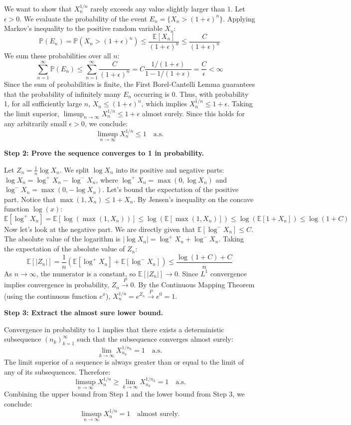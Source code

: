 \begin{solution}
We want to show that $X_n^{1/n}$ rarely exceeds any value slightly larger than $1$. Let $\epsilon > 0$. We evaluate the probability of the event $E_n = \{X_n > (1+\epsilon)^n\}$.
Applying Markov's inequality to the positive random variable $X_n$:
\[ \mathbb{P}(E_n) = \mathbb{P}(X_n > (1+\epsilon)^n) \leq \frac{\mathbb{E}[X_n]}{(1+\epsilon)^n} \leq \frac{C}{(1+\epsilon)^n} \]
We sum these probabilities over all $n$:
\[ \sum_{n=1}^\infty \mathbb{P}(E_n) \leq \sum_{n=1}^\infty \frac{C}{(1+\epsilon)^n} = C \frac{1/(1+\epsilon)}{1 - 1/(1+\epsilon)} = \frac{C}{\epsilon} < \infty \]
Since the sum of probabilities is finite, the First Borel-Cantelli Lemma guarantees that the probability of infinitely many $E_n$ occurring is 0.
Thus, with probability 1, for all sufficiently large $n$, $X_n \leq (1+\epsilon)^n$, which implies $X_n^{1/n} \leq 1+\epsilon$.
Taking the limit superior, $\limsup_{n \to \infty} X_n^{1/n} \leq 1+\epsilon$ almost surely. Since this holds for any arbitrarily small $\epsilon > 0$, we conclude:
\[ \limsup_{n \to \infty} X_n^{1/n} \leq 1 \quad \text{a.s.} \]

\textbf{Step 2: Prove the sequence converges to 1 in probability.}

Let $Z_n = \frac{1}{n} \log X_n$. We split $\log X_n$ into its positive and negative parts: $\log X_n = \log^+ X_n - \log^- X_n$, where $\log^+ X_n = \max(0, \log X_n)$ and $\log^- X_n = \max(0, -\log X_n)$.
Let's bound the expectation of the positive part. Notice that $\max(1, X_n) \leq 1 + X_n$. By Jensen's inequality on the concave function $\log(x)$:
\[ \mathbb{E}[\log^+ X_n] = \mathbb{E}[\log(\max(1, X_n))] \leq \log(\mathbb{E}[\max(1, X_n)]) \leq \log(\mathbb{E}[1 + X_n]) \leq \log(1+C) \]
Now let's look at the negative part. We are directly given that $\mathbb{E}[\log^- X_n] \leq C$.
The absolute value of the logarithm is $|\log X_n| = \log^+ X_n + \log^- X_n$.
Taking the expectation of the absolute value of $Z_n$:
\[ \mathbb{E}[|Z_n|] = \frac{1}{n} \left( \mathbb{E}[\log^+ X_n] + \mathbb{E}[\log^- X_n] \right) \leq \frac{\log(1+C) + C}{n} \]
As $n \to \infty$, the numerator is a constant, so $\mathbb{E}[|Z_n|] \to 0$.
Since $L^1$ convergence implies convergence in probability, $Z_n \xrightarrow{P} 0$.
By the Continuous Mapping Theorem (using the continuous function $e^x$), $X_n^{1/n} = e^{Z_n} \xrightarrow{P} e^0 = 1$.

\textbf{Step 3: Extract the almost sure lower bound.}

Convergence in probability to 1 implies that there exists a deterministic subsequence $(n_k)_{k=1}^\infty$ such that the subsequence converges almost surely:
\[ \lim_{k \to \infty} X_{n_k}^{1/n_k} = 1 \quad \text{a.s.} \]
The limit superior of a sequence is always greater than or equal to the limit of any of its subsequences. Therefore:
\[ \limsup_{n \to \infty} X_n^{1/n} \geq \lim_{k \to \infty} X_{n_k}^{1/n_k} = 1 \quad \text{a.s.} \]
Combining the upper bound from Step 1 and the lower bound from Step 3, we conclude:
\[ \limsup_{n \to \infty} X_n^{1/n} = 1 \quad \text{almost surely.} \]
\end{solution}


